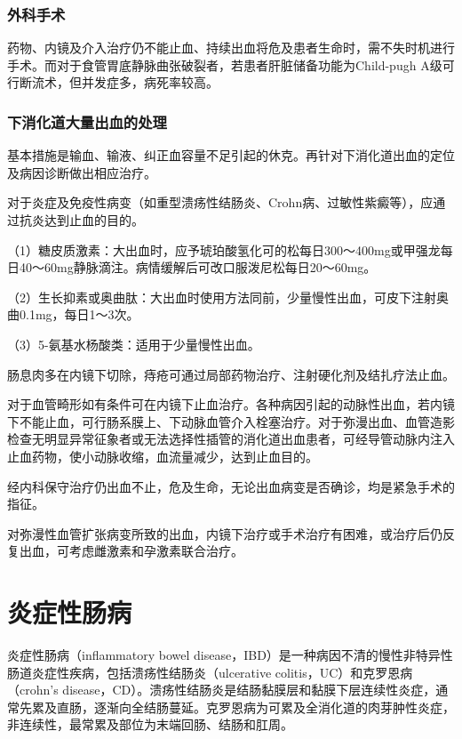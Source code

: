 \subsubsection{外科手术}

药物、内镜及介入治疗仍不能止血、持续出血将危及患者生命时，需不失时机进行手术。而对于食管胃底静脉曲张破裂者，若患者肝脏储备功能为Child-pugh
A级可行断流术，但并发症多，病死率较高。

\subsubsection{下消化道大量出血的处理}

基本措施是输血、输液、纠正血容量不足引起的休克。再针对下消化道出血的定位及病因诊断做出相应治疗。

对于炎症及免疫性病变（如重型溃疡性结肠炎、Crohn病、过敏性紫癜等），应通过抗炎达到止血的目的。

（1）糖皮质激素：大出血时，应予琥珀酸氢化可的松每日300～400mg或甲强龙每日40～60mg静脉滴注。病情缓解后可改口服泼尼松每日20～60mg。

（2）生长抑素或奥曲肽：大出血时使用方法同前，少量慢性出血，可皮下注射奥曲0.1mg，每日1～3次。

（3）5-氨基水杨酸类：适用于少量慢性出血。

肠息肉多在内镜下切除，痔疮可通过局部药物治疗、注射硬化剂及结扎疗法止血。

对于血管畸形如有条件可在内镜下止血治疗。各种病因引起的动脉性出血，若内镜下不能止血，可行肠系膜上、下动脉血管介入栓塞治疗。对于弥漫出血、血管造影检查无明显异常征象者或无法选择性插管的消化道出血患者，可经导管动脉内注入止血药物，使小动脉收缩，血流量减少，达到止血目的。

经内科保守治疗仍出血不止，危及生命，无论出血病变是否确诊，均是紧急手术的指征。

对弥漫性血管扩张病变所致的出血，内镜下治疗或手术治疗有困难，或治疗后仍反复出血，可考虑雌激素和孕激素联合治疗。

\section{炎症性肠病}

炎症性肠病（inflammatory bowel
disease，IBD）是一种病因不清的慢性非特异性肠道炎症性疾病，包括溃疡性结肠炎（ulcerative
colitis，UC）和克罗恩病（crohn's
disease，CD）。溃疡性结肠炎是结肠黏膜层和黏膜下层连续性炎症，通常先累及直肠，逐渐向全结肠蔓延。克罗恩病为可累及全消化道的肉芽肿性炎症，非连续性，最常累及部位为末端回肠、结肠和肛周。

